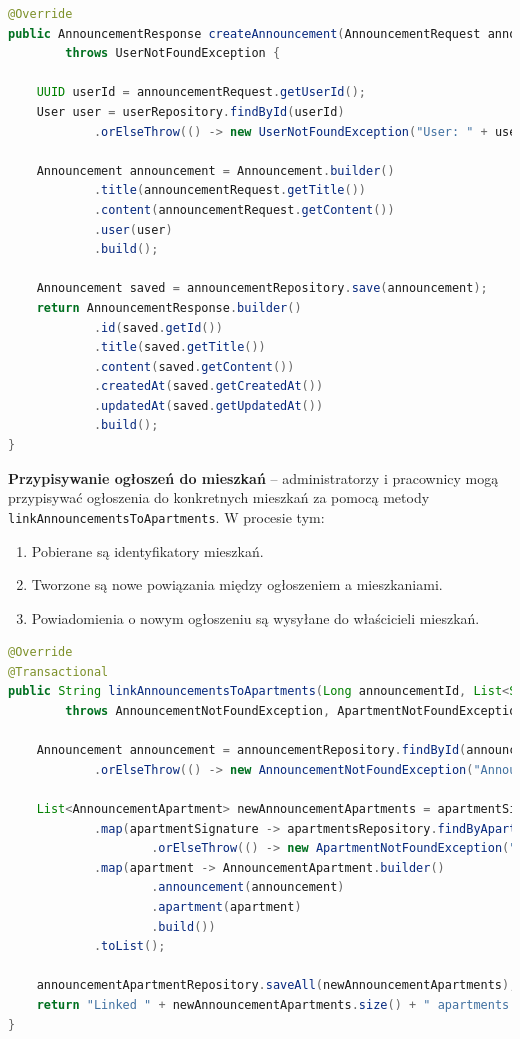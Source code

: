 \begin{lstlisting}[language=Java, style=JavaStyle, caption=Dodawanie ogłoszenia.]
@Override
public AnnouncementResponse createAnnouncement(AnnouncementRequest announcementRequest) 
        throws UserNotFoundException {

    UUID userId = announcementRequest.getUserId();
    User user = userRepository.findById(userId)
            .orElseThrow(() -> new UserNotFoundException("User: " + userId + " not found"));

    Announcement announcement = Announcement.builder()
            .title(announcementRequest.getTitle())
            .content(announcementRequest.getContent())
            .user(user)
            .build();

    Announcement saved = announcementRepository.save(announcement);
    return AnnouncementResponse.builder()
            .id(saved.getId())
            .title(saved.getTitle())
            .content(saved.getContent())
            .createdAt(saved.getCreatedAt())
            .updatedAt(saved.getUpdatedAt())
            .build();
}
\end{lstlisting}

\textbf{Przypisywanie ogłoszeń do mieszkań} -- administratorzy i pracownicy mogą przypisywać ogłoszenia do konkretnych mieszkań za pomocą metody \texttt{linkAnnouncementsToApartments}. W procesie tym:
\begin{enumerate}
    \item Pobierane są identyfikatory mieszkań.
    \item Tworzone są nowe powiązania między ogłoszeniem a mieszkaniami.
    \item Powiadomienia o nowym ogłoszeniu są wysyłane do właścicieli mieszkań.
\end{enumerate}

\begin{lstlisting}[language=Java, style=JavaStyle, caption=Przypisywanie ogłoszeń do mieszkań.]
@Override
@Transactional
public String linkAnnouncementsToApartments(Long announcementId, List<String> apartmentSignatures) 
        throws AnnouncementNotFoundException, ApartmentNotFoundException {

    Announcement announcement = announcementRepository.findById(announcementId)
            .orElseThrow(() -> new AnnouncementNotFoundException("Announcement: " + announcementId + " not found"));

    List<AnnouncementApartment> newAnnouncementApartments = apartmentSignatures.stream()
            .map(apartmentSignature -> apartmentsRepository.findByApartmentSignature(apartmentSignature)
                    .orElseThrow(() -> new ApartmentNotFoundException("Apartment: " + apartmentSignature + " not found")))
            .map(apartment -> AnnouncementApartment.builder()
                    .announcement(announcement)
                    .apartment(apartment)
                    .build())
            .toList();

    announcementApartmentRepository.saveAll(newAnnouncementApartments);
    return "Linked " + newAnnouncementApartments.size() + " apartments to announcement: " + announcementId;
}
\end{lstlisting}

